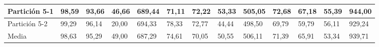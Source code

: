 \documentclass[10pt,a4paper]{article}
\begin{document}
\begin{table}[ht]
{\begin{tabular}{|l|l|l|l|l|l|l|l|l|l|l|l|l|}
Partición 5-1                                & 98,59        & 93,66         & 46,66   & 689,44 & 71,11        & 72,22         & 53,33   & 505,05 & 72,68        & 67,18         & 55,39   & 944,00 \\ \hline
Partición 5-2                                & 99,29        & 96,14         & 20,00   & 694,33 & 78,33        & 72,77         & 44,44   & 498,50 & 69,79        & 59,79         & 56,11   & 929,24 \\ \hline
Media                                        & 98,63        & 95,29         & 49,00   & 687,29 & 74,61        & 70,05         & 50,55   & 506,11 & 71,39        & 65,91         & 53,34   & 939,71 \\ \hline
\end{tabular}}
\end{table}
\end{document}
